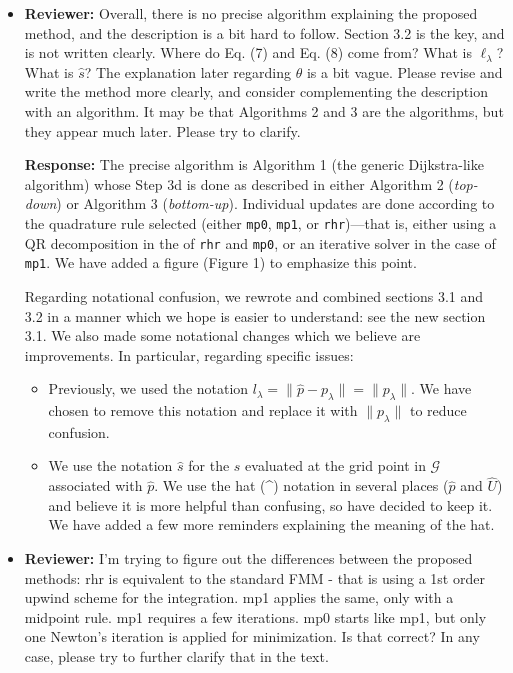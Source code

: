 \documentclass{article}
\begin{document}
\begin{itemize}

\item \textbf{Reviewer:} Overall, there is no precise algorithm
  explaining the proposed method, and the description is a bit hard to
  follow. Section 3.2 is the key, and is not written clearly. Where do
  Eq. (7) and Eq. (8) come from? What is $\ell_\lambda$? What is
  $\hat{s}$? The explanation later regarding $\theta$ is a bit
  vague. Please revise and write the method more clearly, and consider
  complementing the description with an algorithm. It may be that
  Algorithms 2 and 3 are the algorithms, but they appear much
  later. Please try to clarify.

  \textbf{Response:} The precise algorithm is Algorithm 1 (the generic
  Dijkstra-like algorithm) whose Step 3d is done as described in
  either Algorithm 2 (\emph{top-down}) or Algorithm 3
  (\emph{bottom-up}). Individual updates are done according to the
  quadrature rule selected (either \texttt{mp0}, \texttt{mp1}, or
  \texttt{rhr})---that is, either using a QR decomposition in the of
  \texttt{rhr} and \texttt{mp0}, or an iterative solver in the case of
  \texttt{mp1}. We have added a figure (Figure 1) to emphasize this
  point.

  Regarding notational confusion, we rewrote and combined sections 3.1
  and 3.2 in a manner which we hope is easier to understand: see the
  new section 3.1. We also made some notational changes which we
  believe are improvements. In particular, regarding specific issues:
  \begin{itemize}
  \item Previously, we used the notation
    $l_\lambda = \|\hat{p} - p_\lambda\| = \|p_\lambda\|$. We have
    chosen to remove this notation and replace it with $\|p_\lambda\|$
    to reduce confusion.
  \item We use the notation $\hat{s}$ for the $s$ evaluated at the
    grid point in $\mathcal{G}$ associated with $\hat{p}$. We use the
    hat (\^{}) notation in several places ($\hat{p}$ and $\hat{U}$)
    and believe it is more helpful than confusing, so have decided to
    keep it. We have added a few more reminders explaining the meaning
    of the hat.
  \end{itemize}

\item \textbf{Reviewer:} I'm trying to figure out the differences
  between the proposed methods: rhr is equivalent to the standard FMM
  - that is using a 1st order upwind scheme for the integration. mp1
  applies the same, only with a midpoint rule. mp1 requires a few
  iterations. mp0 starts like mp1, but only one Newton's iteration is
  applied for minimization. Is that correct? In any case, please try
  to further clarify that in the text.


\end{itemize}
\end{document}
